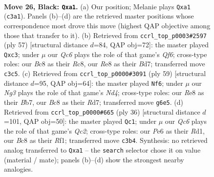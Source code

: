 \documentclass[11pt]{article}
\begin{document}
\clearpage

\begin{figure}[p]\centering
\begin{subfigure}{0.46\textwidth}\centering
\resizebox{\linewidth}{!}{%
\newchessgame
\chessboard[
  setfen={rnb1r3/1p1k1p1R/4p1n1/p1P1P1Q1/P4P2/2q5/4BK2/R1B3N1 b - - 2 26},
  showmover=false,
  pgfstyle=straightmove, color=movearrow, markmove={c3-a1}
]}
\caption{}
\end{subfigure}\hfill
\begin{subfigure}{0.46\textwidth}\centering
\resizebox{\linewidth}{!}{%
\newchessgame
\chessboard[
  setfen={2r3k1/1p1b1pp1/p1n4p/P1QP4/2N5/2P2qP1/7P/4RBK1 b - - 0 29},
  showmover=false,
  pgfstyle=straightmove, color=movearrow, markmove={f3-c3}
]}
\caption{}
\end{subfigure}
\\[4pt]
\begin{subfigure}{0.46\textwidth}\centering
\resizebox{\linewidth}{!}{%
\newchessgame
\chessboard[
  setfen={6k1/1b1r1p1p/2p3p1/1p1nP3/3Q1P1q/1P4NP/6PK/2R2B2 b - - 2 30},
  showmover=false,
  pgfstyle=straightmove, color=movearrow, markmove={d5-f6}
]}
\caption{}
\end{subfigure}\hfill
\begin{subfigure}{0.46\textwidth}\centering
\resizebox{\linewidth}{!}{%
\newchessgame
\chessboard[
  setfen={r1b1r1k1/5pbp/2p3p1/3q4/2pN4/P3BP2/1PQ3PP/3R1RK1 w - - 2 19},
  showmover=false,
  pgfstyle=straightmove, color=movearrow, markmove={c2-c1}
]}
\caption{}
\end{subfigure}
\caption{\textbf{Move 26, Black: \texttt{Qxa1}.} (a) Our position; Melanie plays \texttt{Qxa1} (\texttt{c3a1}). Panels (b)--(d) are the retrieved master positions whose correspondence most drove this move (highest QAP objective among those that transfer to it). (b) Retrieved from \texttt{ccrl\_top\_p0003\#2597} (ply 57) [structural distance $d$=84, QAP obj=72]: the master played \texttt{Qxc3}; under $\mu$ our \emph{Qc6} plays the role of that game's \emph{Qf6}; cross-type roles: our \emph{B}c8 as their \emph{R}c8, our \emph{R}e8 as their \emph{B}d7; transferred move \texttt{c3c5}. (c) Retrieved from \texttt{ccrl\_top\_p0000\#3091} (ply 59) [structural distance $d$=95, QAP obj=64]: the master played \texttt{Nf6}; under $\mu$ our \emph{Ng3} plays the role of that game's \emph{Nd4}; cross-type roles: our \emph{R}e8 as their \emph{B}b7, our \emph{B}c8 as their \emph{R}d7; transferred move \texttt{g6e5}. (d) Retrieved from \texttt{ccrl\_top\_p0000\#665} (ply 36) [structural distance $d$=101, QAP obj=50]: the master played \texttt{Qc1}; under $\mu$ our \emph{Qc6} plays the role of that game's \emph{Qc2}; cross-type roles: our \emph{P}e6 as their \emph{R}d1, our \emph{B}c8 as their \emph{R}f1; transferred move \texttt{c3b4}. Synthesis: no retrieved analog transferred to \texttt{Qxa1} -- the \texttt{search} selector chose it on value (material / mate); panels (b)--(d) show the strongest nearby analogies.}
\label{fig:thought-m51}
\end{figure}
\end{document}
